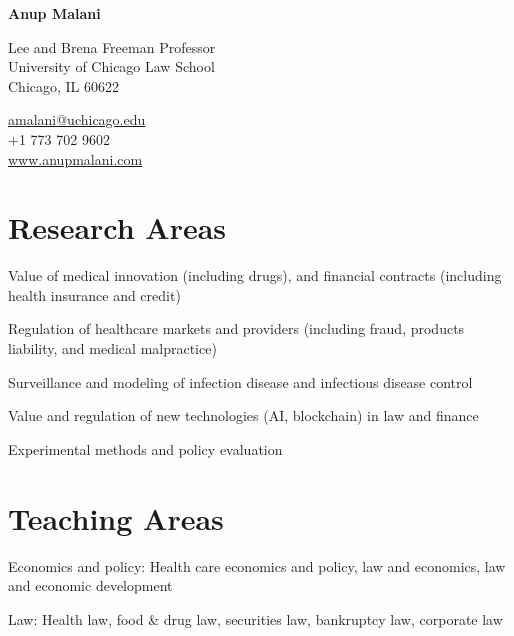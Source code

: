 \documentclass[11pt,letterpaper]{report}
\newcommand{\myname}{Anup Malani}
\newcommand{\namefont}[1]{{\normalfont\bfseries\Huge{#1}}}
\newcommand{\listitemspace}{0.25em}
\renewenvironment{itemize}
{\begin{list}{}{\setlength{\leftmargin}{0em}
                \setlength{\parskip}{0em}
                \setlength{\itemsep}{\listitemspace}
                \setlength{\parsep}{\listitemspace}}}
{\end{list}}
\begin{document}
    \raggedright{}

    \namefont{\myname}

    \vspace{1em}
    \begin{minipage}[t]{0.700\textwidth}
        Lee and Brena Freeman Professor \\
        University of Chicago Law School \\
        Chicago, IL 60622 
    \end{minipage}
    \begin{minipage}[t]{0.295\textwidth}
        \flushright{}
        \href{mailto:amalani@uchicago.edu}{amalani@uchicago.edu} \\
        +1 773 702 9602 \\
        \href{https://www.anupmalani.com}{www.anupmalani.com}
    \end{minipage}


    \section*{Research Areas}

    \begin{itemize}

        \item Value of medical innovation (including drugs), and financial contracts (including health insurance and credit)
        \item Regulation of healthcare markets and providers (including fraud, products liability, and medical malpractice)
        \item Surveillance and modeling of infection disease and infectious disease control 
        \item Value and regulation of new technologies (AI, blockchain) in law and finance
        \item Experimental methods and policy evaluation 

    \end{itemize}
    
    \section*{Teaching Areas}

    \begin{itemize}

        \item Economics and policy: Health care economics and policy, law and economics, law and economic development
        \item Law: Health law, food \& drug law, securities law, bankruptcy law, corporate law

    \end{itemize}
\end{document}
